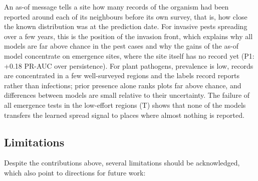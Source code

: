 \documentclass[a4paper,fleqn]{cas-sc}
\begin{document}
An as-of message tells a site how many records of the organism had been reported around each of its neighbours before its own survey, that is, how close the known distribution was at the prediction date. For invasive pests spreading over a few years, this is the position of the invasion front, which explains why all models are far above chance in the pest cases and why the gains of the as-of model concentrate on emergence sites, where the site itself has no record yet (P1: +0.18 PR-AUC over persistence). For plant pathogens, prevalence is low, records are concentrated in a few well-surveyed regions and the labels record reports rather than infections; prior presence alone ranks plots far above chance, and differences between models are small relative to their uncertainty. The failure of all emergence tests in the low-effort regions (T) shows that none of the models transfers the learned spread signal to places where almost nothing is reported.

\subsection{Limitations}
\label{sec:limitations}

Despite the contributions above, several limitations should be acknowledged, which also point to directions for future work:
\end{document}
